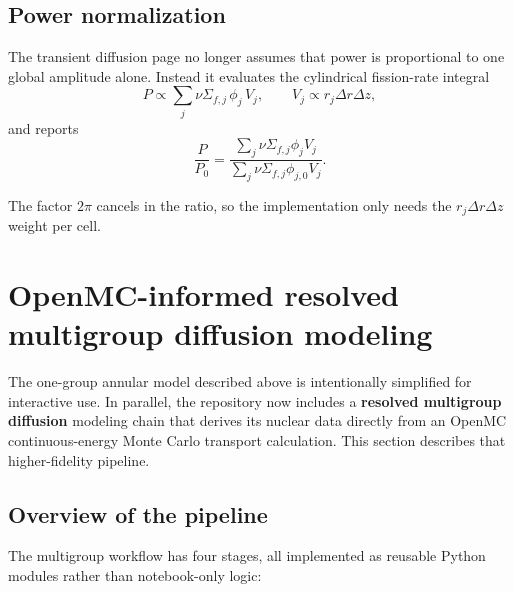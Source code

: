 \documentclass[11pt]{article}
\begin{document}
\subsection{Power normalization}

The transient diffusion page no longer assumes that power is proportional to one
global amplitude alone.  Instead it evaluates the cylindrical fission-rate
integral
\[
P \propto \sum_j \nu\Sigma_{f,j}\,\phi_j\,V_j,
\qquad
V_j \propto r_j \Delta r \Delta z,
\]
and reports
\[
\frac{P}{P_0}
=
\frac{\sum_j \nu\Sigma_{f,j}\phi_j V_j}
{\sum_j \nu\Sigma_{f,j}\phi_{j,0} V_j}.
\]

The factor $2\pi$ cancels in the ratio, so the implementation only needs the
$r_j \Delta r \Delta z$ weight per cell.

\section{OpenMC-informed resolved multigroup diffusion modeling}

The one-group annular model described above is intentionally simplified for
interactive use.  In parallel, the repository now includes a
\textbf{resolved multigroup diffusion} modeling chain that derives its nuclear
data directly from an OpenMC continuous-energy Monte Carlo transport
calculation.  This section describes that higher-fidelity pipeline.

\subsection{Overview of the pipeline}

The multigroup workflow has four stages, all implemented as reusable Python
modules rather than notebook-only logic:
\end{document}
